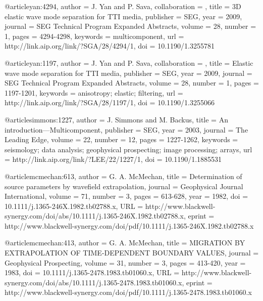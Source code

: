 @article{yan:4294,
author = {J. Yan and P. Sava},
collaboration = {},
title = {3{D} elastic wave mode separation for {TTI} media},
publisher = {SEG},
year = {2009},
journal = {SEG Technical Program Expanded Abstracts},
volume = {28},
number = {1},
pages = {4294-4298},
keywords = {multicomponent},
url = {http://link.aip.org/link/?SGA/28/4294/1},
doi = {10.1190/1.3255781}
}







@article{yan:1197,
author = {J. Yan and P. Sava},
collaboration = {},
title = {Elastic wave mode separation for {TTI} media},
publisher = {SEG},
year = {2009},
journal = {SEG Technical Program Expanded Abstracts},
volume = {28},
number = {1},
pages = {1197-1201},
keywords = {anisotropy; elastic; filtering},
url = {http://link.aip.org/link/?SGA/28/1197/1},
doi = {10.1190/1.3255066}
}






@article{simmons:1227,
  author =	 {J. Simmons and M. Backus},
  title =	 {An introduction---{M}ulticomponent},
  publisher =	 {SEG},
  year =	 2003,
  journal =	 {The Leading Edge},
  volume =	 22,
  number =	 12,
  pages =	 {1227-1262},
  keywords =	 {seismology; data analysis; geophysical prospecting;
                  image processing; arrays},
  url =		 {http://link.aip.org/link/?LEE/22/1227/1},
  doi =		 {10.1190/1.1885531}
}

@article{mcmechan:613,
  author =	 {G. A. McMechan},
  title =	 {Determination of source parameters by wavefield
                  extrapolation},
  journal =	 {Geophysical Journal International},
  volume =	 71,
  number =	 3,
  pages =	 {613-628},
  year =	 1982,
  doi =		 {10.1111/j.1365-246X.1982.tb02788.x},
  URL =
                  {http://www.blackwell-synergy.com/doi/abs/10.1111/j.1365-246X.1982.tb02788.x},
  eprint =
                  {http://www.blackwell-synergy.com/doi/pdf/10.1111/j.1365-246X.1982.tb02788.x}
}

@article{mcmechan:413,
  author =	 {G. A. McMechan},
  title =	 {MIGRATION BY EXTRAPOLATION OF TIME-DEPENDENT
                  BOUNDARY VALUES},
  journal =	 {Geophysical Prospecting},
  volume =	 31,
  number =	 3,
  pages =	 {413-420},
  year =	 1983,
  doi =		 {10.1111/j.1365-2478.1983.tb01060.x},
  URL =
                  {http://www.blackwell-synergy.com/doi/abs/10.1111/j.1365-2478.1983.tb01060.x},
  eprint =
                  {http://www.blackwell-synergy.com/doi/pdf/10.1111/j.1365-2478.1983.tb01060.x}
}

